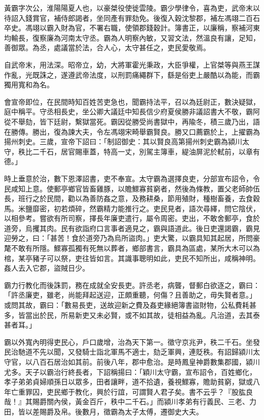 \begin{pinyinscope}
黃霸字次公，淮陽陽夏人也，以豪桀役使徙雲陵。霸少學律令，喜為吏，武帝末以待詔入錢賞官，補侍郎謁者，坐同產有罪劾免。後復入穀沈黎郡，補左馮翊二百石卒史。馮翊以霸入財為官，不署右職，使領郡錢穀計。簿書正，以廉稱，察補河東均輸長，復察廉為河南太守丞。霸為人明察內敏，又習文法，然溫良有讓，足知，善御眾。為丞，處議當於法，合人心，太守甚任之，吏民愛敬焉。

自武帝末，用法深。昭帝立，幼，大將軍霍光秉政，大臣爭權，上官桀等與燕王謀作亂，光既誅之，遂遵武帝法度，以刑罰痛繩群下，繇是俗吏上嚴酷以為能，而霸獨用寬和為名。

會宣帝即位，在民間時知百姓苦吏急也，聞霸持法平，召以為廷尉正，數決疑獄，庭中稱平。守丞相長史，坐公卿大議廷中知長信少府夏侯勝非議詔書大不敬，霸阿從不舉劾，皆下廷尉，繫獄當死。霸因從勝受尚書獄中，再隃冬，積三歲乃出，語在勝傳。勝出，復為諫大夫，令左馮翊宋畸舉霸賢良。勝又口薦霸於上，上擢霸為揚州刺史。三歲，宣帝下詔曰：「制詔御史：其以賢良高第揚州刺史霸為潁川太守，秩比二千石，居官賜車蓋，特高一丈，別駕主簿車，緹油屏泥於軾前，以章有德。」

時上垂意於治，數下恩澤詔書，吏不奉宣。太守霸為選擇良吏，分部宣布詔令，令民咸知上意。使郵亭鄉官皆畜雞豚，以贍鰥寡貧窮者，然後為條教，置父老師帥伍長，班行之於民間，勸以為善防姦之意，及務耕桑，節用殖財，種樹畜養，去食穀馬。米鹽靡密，初若煩碎，然霸精力能推行之。吏民見者，語次尋繹，問它陰伏，以相參考。嘗欲有所司察，擇長年廉吏遣行，屬令周密。吏出，不敢舍郵亭，食於道旁，烏攫其肉。民有欲詣府口言事者適見之，霸與語道此。後日吏還謁霸，霸見迎勞之，曰：「甚苦！食於道旁乃為烏所盜肉。」吏大驚，以霸具知其起居，所問豪氂不敢有所隱。鰥寡孤獨有死無以葬者，鄉部書言，霸具為區處，某所大木可以為棺，某亭豬子可以祭，吏往皆如言。其識事聰明如此，吏民不知所出，咸稱神明。姦人去入它郡，盜賊日少。

霸力行教化而後誅罰，務在成就全安長吏。許丞老，病聾，督郵白欲逐之，霸曰：「許丞廉吏，雖老，尚能拜起送迎，正頗重聽，何傷？且善助之，毋失賢者意。」或問其故，霸曰：「數易長吏，送故迎新之費及姦吏緣絕簿書盜財物，公私費耗甚多，皆當出於民，所易新吏又未必賢，或不如其故，徒相益為亂。凡治道，去其泰甚者耳。」

霸以外寬內明得吏民心，戶口歲增，治為天下第一。徵守京兆尹，秩二千石。坐發民治馳道不先以聞，又發騎士詣北軍馬不適士，劾乏軍興，連貶秩。有詔歸潁川太守官，以八百石居治如其前。前後八年，郡中愈治。是時鳳皇神爵數集郡國，潁川尤多。天子以霸治行終長者，下詔稱揚曰：「穎川太守霸，宣布詔令，百姓鄉化，孝子弟弟貞婦順孫日以眾多，田者讓畔，道不拾遺，養視鰥寡，贍助貧窮，獄或八年亡重罪囚，吏民鄉于教化，興於行誼，可謂賢人君子矣。書不云乎？『股肱良哉！』其賜爵關內侯，黃金百斤，秩中二千石。」而潁川孝弟有行義民、三老、力田，皆以差賜爵及帛。後數月，徵霸為太子太傅，遷御史大夫。


\end{pinyinscope}

